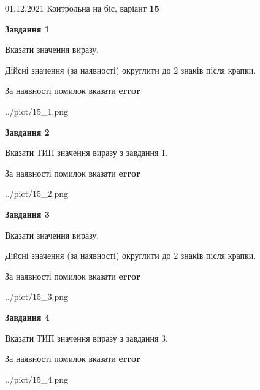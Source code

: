 \documentclass[11pt, ukrainian]{article}
\begin{document}
{01.12.2021 Контрольна на біс, варіант  \No \textbf { 15 }\par}
{
\begin {large}
{\begin {center}\textbf{Завдання 1}\end {center}}\par
Вказати значення виразу. \par
Дійсні значення (за наявності) округлити до 2 знаків після крапки. \par
За наявності помилок вказати \textbf{error}

\begin{center}
	{../pict/15_1.png}
\end{center}
\newpage

{\begin {center}\textbf{Завдання 2}\end {center}}\par
Вказати ТИП значення виразу з завдання 1. \par
За наявності помилок вказати \textbf{error}

\begin{center}
	{../pict/15_2.png}
\end{center}
\newpage

{\begin {center}\textbf{Завдання 3}\end {center}}\par
Вказати значення виразу. \par
Дійсні значення (за наявності) округлити до 2 знаків після крапки. \par
За наявності помилок вказати \textbf{error}

\begin{center}
	{../pict/15_3.png}
\end{center}
\newpage

{\begin {center}\textbf{Завдання 4}\end {center}}\par
Вказати ТИП значення виразу з завдання 3. \par
За наявності помилок вказати \textbf{error}

\begin{center}
	{../pict/15_4.png}
\end{center}
\newpage


\end{large}}
\end{document}
